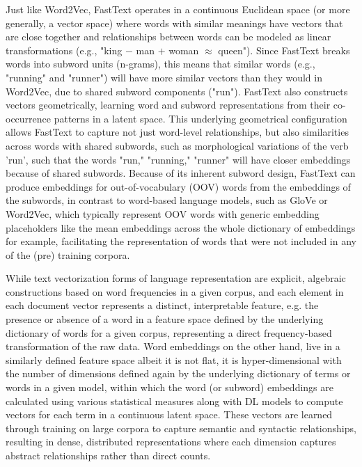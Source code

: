 \documentclass[final]{clv2025-revised}
\begin{document}
Just like Word2Vec, FastText operates in a continuous Euclidean space (or more generally, a vector space) where words with similar meanings have vectors that are close together and relationships between words can be modeled as linear transformations (e.g., "king $-$ man $+$ woman $\approx$ queen"). Since FastText breaks words into subword units (n-grams), this means that similar words (e.g., "running" and "runner") will have more similar vectors than they would in Word2Vec, due to shared subword components ("run"). FastText also constructs vectors geometrically, learning word and subword representations from their co-occurrence patterns in a latent space. This underlying geometrical configuration allows FastText to capture not just word-level relationships, but also similarities across words with shared subwords, such as morphological variations of the verb 'run', such that the words "run," "running," "runner" will have closer embeddings because of shared subwords. Because of its inherent subword design, FastText can produce embeddings for out-of-vocabulary (OOV) words from the embeddings of the subwords, in contrast to word-based language models, such as GloVe or Word2Vec, which typically represent OOV words with generic embedding placeholders like the mean embeddings across the whole dictionary of embeddings for example, facilitating the representation of words that were not included in any of the (pre) training corpora.

While text vectorization forms of language representation are explicit, algebraic constructions based on word frequencies in a given corpus, and each element in each document vector represents a distinct, interpretable feature, e.g. the presence or absence of a word in a feature space defined by the underlying dictionary of words for a given corpus, representing a direct frequency-based transformation of the raw data. Word embeddings on the other hand, live in a similarly defined feature space albeit it is not flat, it is hyper-dimensional with the number of dimensions defined again by the underlying dictionary of terms or words in a given model, within which the word (or subword) embeddings are calculated using various statistical measures along with DL models to compute vectors for each term in a continuous latent space. These vectors are learned through training on large corpora to capture semantic and syntactic relationships, resulting in dense, distributed representations where each dimension captures abstract relationships rather than direct counts. 
\end{document}
